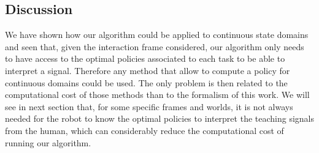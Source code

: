 \newpage 

\subsection{Discussion}

We have shown how our algorithm could be applied to continuous state domains and seen that, given the interaction frame considered, our algorithm only needs to have access to the optimal policies associated to each task to be able to interpret a signal. Therefore any method that allow to compute a policy for continuous domains could be used. The only problem is then related to the computational cost of those methods than to the formalism of this work. We will see in next section that, for some specific frames and worlds, it is not always needed for the robot to know the optimal policies to interpret the teaching signals from the human, which can considerably reduce the computational cost of running our algorithm.